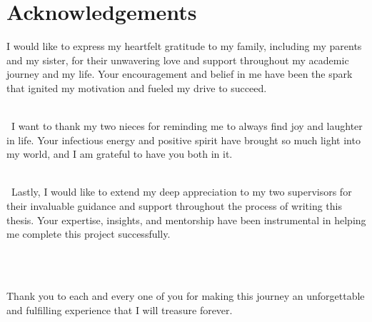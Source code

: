 \chapter*{Acknowledgements}
\thispagestyle{empty}

I would like to express my heartfelt gratitude to my family, including my parents and my sister, for their unwavering love and support throughout my academic journey and my life. 
Your encouragement and belief in me have been the spark that ignited my motivation and fueled my drive to succeed.

\ \\ \
I want to thank my two nieces for reminding me to always find joy and laughter in life. Your infectious energy and positive spirit have brought so much light into my world, and I am grateful to have you both in it.

\ \\ \
Lastly, I would like to extend my deep appreciation to my two supervisors for their invaluable guidance and support throughout the process of writing this thesis. Your expertise, insights, and mentorship have been instrumental in helping me complete this project successfully.

\ \\ \
\begin{center}
Thank you to each and every one of you for making this journey an unforgettable and fulfilling experience that I will treasure forever.
\end{center}

\clearpage